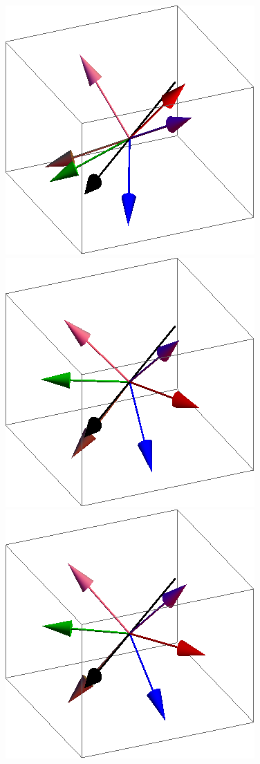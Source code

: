 \documentclass{article}
\begin{document}
\begin{figure}[ht]
\centering
\includegraphics[scale=0.27]{110/1S005to000G.png}
\includegraphics[scale=0.27]{110/2S005to000G.png}
\includegraphics[scale=0.27]{110/200S005to000G.png}

\end{figure}
\end{document}
